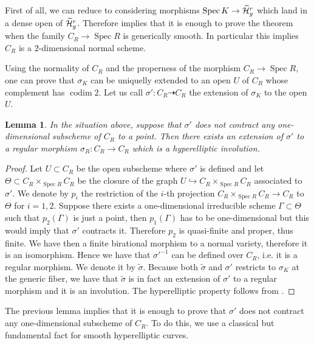 \documentclass{alggeom}
\numberwithin{equation}{section}
\numberwithin{subsection}{section}
\newtheorem{lemma}[theorem]{Lemma}
\theoremstyle{definition}
\theoremstyle{remark}
\newcommand\spec{\operatorname{Spec}}
\newcommand\codim{\operatorname{codim}}
\newcommand{\Htilde}{\widetilde{\cH}}
\begin{document}
First of all, we can reduce to considering morphisms $\spec K \rightarrow \Htilde_g^r$ which land in a dense open of $\Htilde_g^r$. Therefore  implies that it is enough to prove the theorem when the family $C_R \rightarrow \spec R$ is generically smooth. In particular this implies $C_R$ is a $2$-dimensional normal scheme.

Using the normality of $C_R$ and the properness of the morphism $C_R \rightarrow \spec R$, one can prove that $\sigma_K$ can be uniquelly extended to an open $U$ of $C_R$ whose complement has $\codim 2$. Let us call $\sigma':C_R \dashrightarrow C_R$ the extension of $\sigma_K$ to the open $U$. 

\begin{lemma}\label{lem:contract}
	In the situation above, suppose that $\sigma'$ does not contract any one-dimensional subscheme of $C_R$ to a point. Then there exists an extension of $\sigma'$ to a regular morphism $\sigma_R:C_R\rightarrow C_R$ which is a hyperelliptic involution. 
\end{lemma}

\begin{proof}
	Let $U\subset C_R$ be the open subscheme where $\sigma'$ is defined and let $\Theta\subset C_R\times_{\spec R} C_R$ be the closure of the graph $U\hookrightarrow C_R\times_{\spec R} C_R$ associated to $\sigma'$. We denote by $p_i$ the restriction of the $i$-th projection $C_R\times_{\spec R} C_R \rightarrow C_R$ to $\Theta$ for $i=1,2$. Suppose there exists a one-dimensional irreducible scheme $\Gamma\subset \Theta$ such that $p_2(\Gamma)$ is just a point, then $p_1(\Gamma)$ has to be one-dimensional but this would imply that $\sigma'$ contracts it. Therefore $p_2$ is quasi-finite and proper, thus finite. We have then a finite birational morphism to a normal variety, therefore it is an isomorphism. Hence we have that $\sigma'^{-1}$ can be defined over $C_R$, i.e. it is a regular morphism. We denote it by $\widetilde{\sigma}$. Because both $\widetilde{\sigma}$ and $\sigma'$ restricts to $\sigma_K$ at the generic fiber, we have that $\widetilde{\sigma}$ is in fact an extension of $\sigma'$ to a regular morphism and it is an involution. The hyperelliptic property follows from .
\end{proof}

The previous lemma implies that it is enough to prove that $\sigma'$ does not contract any one-dimensional subscheme of $C_R$. To do this, we use a classical but fundamental fact for smooth hyperelliptic curves. 
\end{document}
